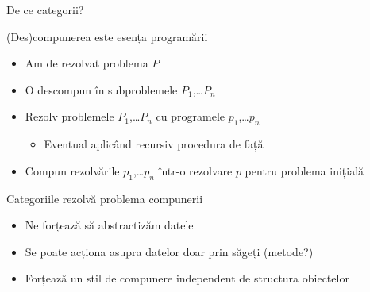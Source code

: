 \documentclass[xcolor=pdftex,romanian,colorlinks]{beamer}
\begin{document}
\begin{frame}{De ce categorii?}
\begin{block}{(Des)compunerea este esența programării}
\begin{itemize}
\item Am de rezolvat problema $P$
\item O descompun în subproblemele $P_1$,\dots $P_n$
\item Rezolv problemele $P_1$,\dots $P_n$ cu programele $p_1$,\dots $p_n$
\begin{itemize}
\item Eventual aplicând recursiv procedura de față
\end{itemize}
\item Compun rezolvările  $p_1$,\dots $p_n$ într-o rezolvare $p$ pentru problema inițială
\end{itemize}
\end{block}

\begin{block}{Categoriile rezolvă problema compunerii}
\begin{itemize}
\item Ne forțează să abstractizăm datele
\item Se poate acționa asupra datelor doar prin săgeți (metode?)
\item Forțează un stil de compunere independent de structura obiectelor
\end{itemize}
\end{block}
\end{frame}
\end{document}

